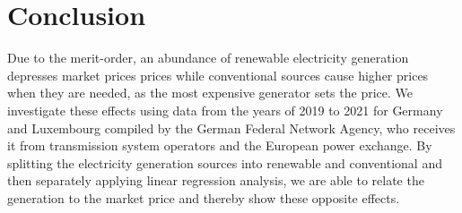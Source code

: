 \documentclass{article}
\begin{document}
\section{Conclusion}
Due to the merit-order, an abundance of renewable electricity generation depresses market prices prices while conventional sources cause higher prices when they are needed, as the most expensive generator sets the price.
We investigate these effects using data from the years of 2019 to 2021 for Germany and Luxembourg compiled by the German Federal Network Agency, who receives it from transmission system operators and the European power exchange.
By splitting the electricity generation sources into renewable and conventional and then separately applying linear regression analysis, we are able to relate the generation to the market price and thereby show these opposite effects.



\end{document}
